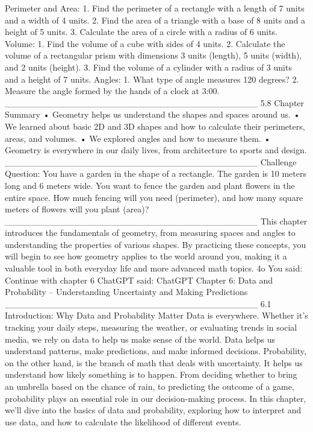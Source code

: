 Perimeter and Area:
1.	Find the perimeter of a rectangle with a length of 7 units and a width of 4 units.
2.	Find the area of a triangle with a base of 8 units and a height of 5 units.
3.	Calculate the area of a circle with a radius of 6 units.
Volume:
1.	Find the volume of a cube with sides of 4 units.
2.	Calculate the volume of a rectangular prism with dimensions 3 units (length), 5 units (width), and 2 units (height).
3.	Find the volume of a cylinder with a radius of 3 units and a height of 7 units.
Angles:
1.	What type of angle measures 120 degrees?
2.	Measure the angle formed by the hands of a clock at 3:00.
________________________________________
5.8 Chapter Summary
•	Geometry helps us understand the shapes and spaces around us.
•	We learned about basic 2D and 3D shapes and how to calculate their perimeters, areas, and volumes.
•	We explored angles and how to measure them.
•	Geometry is everywhere in our daily lives, from architecture to sports and design.
________________________________________
Challenge Question:
You have a garden in the shape of a rectangle. The garden is 10 meters long and 6 meters wide. You want to fence the garden and plant flowers in the entire space. How much fencing will you need (perimeter), and how many square meters of flowers will you plant (area)?
________________________________________
This chapter introduces the fundamentals of geometry, from measuring spaces and angles to understanding the properties of various shapes. By practicing these concepts, you will begin to see how geometry applies to the world around you, making it a valuable tool in both everyday life and more advanced math topics.
4o
You said:
Continue with chapter 6
ChatGPT said:
ChatGPT
Chapter 6: Data and Probability – Understanding Uncertainty and Making Predictions
________________________________________
6.1 Introduction: Why Data and Probability Matter
Data is everywhere. Whether it's tracking your daily steps, measuring the weather, or evaluating trends in social media, we rely on data to help us make sense of the world. Data helps us understand patterns, make predictions, and make informed decisions.
Probability, on the other hand, is the branch of math that deals with uncertainty. It helps us understand how likely something is to happen. From deciding whether to bring an umbrella based on the chance of rain, to predicting the outcome of a game, probability plays an essential role in our decision-making process.
In this chapter, we'll dive into the basics of data and probability, exploring how to interpret and use data, and how to calculate the likelihood of different events.
